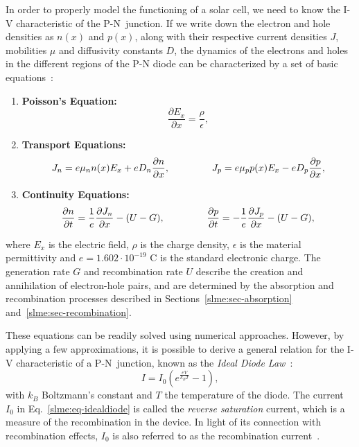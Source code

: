 \begin{refsection}
In order to properly model the functioning of a solar cell, we need to know 
the I-V characteristic of the P-N~junction. If we write down the electron and 
hole densities as $n(x)$ and $p(x)$, along with their respective current 
densities $J$, mobilities $\mu$ and diffusivity constants $D$, the dynamics of 
the electrons and holes in the different regions of the P-N diode can be 
characterized by a set of basic equations~\cite{Shockley1949}: 
\vspace{0.1in} 
\begin{enumerate} 
\item \textbf{Poisson's Equation: } \begin{equation}\frac{\partial 
E_x}{\partial x} = \frac{\rho}{\epsilon},\end{equation} 
 
\item \textbf{Transport Equations: } \begin{equation}J_n = e \mu_n n(x) E_x + 
e D_n\frac{\partial n }{\partial x}, \hspace{0.6in} J_p = e \mu_p p(x) E_x - e 
D_p \frac{\partial p}{\partial x},\end{equation} 
 
\item \textbf{Continuity Equations: } \begin{equation}\frac{\partial 
n}{\partial t} = \frac{1}{e} \frac{\partial J_n}{\partial x} - (U - G), 
\hspace{0.6in} \frac{\partial p}{\partial t} = - \frac{1}{e} \frac{\partial 
J_p}{\partial x} - (U - G),\end{equation} 
 
\end{enumerate} 
where $E_x$ is the electric field, $\rho$ is the charge density, $\epsilon$ is 
the material permittivity and $e = 1.602\cdot 10^{-19}$ C is the standard 
electronic charge. The generation rate $G$ and recombination rate $U$ describe 
the creation and annihilation of electron-hole pairs, and are determined by 
the absorption and recombination processes described in 
Sections~\ref{slme:sec-absorption} and~\ref{slme:sec-recombination}.  
 
These equations can be readily solved using numerical approaches. However, by 
applying a few approximations, it is possible to derive a general relation for 
the I-V characteristic of a P-N~junction, known as the \textit{Ideal Diode 
Law}~\cite{Shockley1949}: 
\begin{equation}\label{slme:eq-idealdiode} 
I = I_0 (e^\frac{e V}{k_B T} - 1), 
\end{equation} 
with $k_B$ Boltzmann's constant and $T$ the temperature of the diode. The 
current $I_0$ in Eq.~\ref{slme:eq-idealdiode} is called the \textit{reverse 
saturation} current, which is a measure of the recombination in the device. In 
light of its connection with recombination effects, $I_0$ is also referred to 
as the recombination current~\cite{Cuevas2014}. 
 

\end{refsection}
